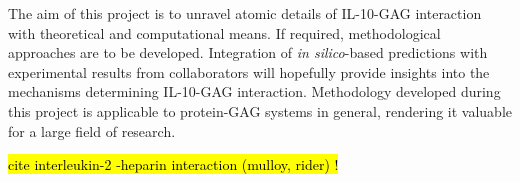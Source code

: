 The aim of this project is to unravel atomic details of IL-10-GAG interaction
with theoretical and computational means. If required, methodological approaches
are to be developed. Integration of \textit{in silico}-based predictions with
experimental results from collaborators will hopefully provide insights into the
mechanisms determining IL-10-GAG interaction. Methodology developed during this
project is applicable to protein-GAG systems in general, rendering it valuable
for a large field of research.



\hl{cite interleukin-2 -heparin interaction (mulloy, rider) !}

\lipsum[1-5]





